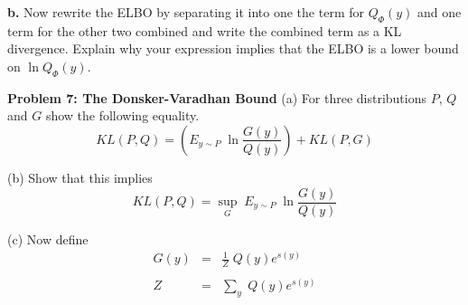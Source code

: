 \documentclass{article}
\newcommand{\solution}[1]{}
\begin{document}
\bigskip
{\bf b.}  Now rewrite the ELBO by separating it into one the term for $Q_\Phi(y)$ and one term for the other two combined and write the combined term
as a KL divergence.  Explain why your expression implies that the ELBO is a lower bound on $\ln Q_\Phi(y)$.

\solution{
  \begin{eqnarray*}
    ELBO & = & E_{z \sim \tilde{Q}_\Psi(z|y)}\;\ln \frac{Q_\Phi(y)Q_\Phi(z|y)}{\tilde{Q}_\Psi(z|y)} \\
    \\
    & = & \left(E_{z \sim \tilde{Q}_\Psi(z|y)}\;\ln Q_\Phi(y)\right) +
    \left(E_{z \sim \tilde{Q}_\Psi(z|y)}\;\ln \frac{Q_\Phi(z|y)}{\tilde{Q}_\Psi(z|y)}\right) \\
    & = & \ln Q_\Phi(y) - KL(\tilde{Q}_\Psi(z|y),Q_\Phi(z|y))
  \end{eqnarray*}

  The lower bound property follows from the fact that KL divergence is non-negative.
}

\bigskip
{\bf Problem 7: The Donsker-Varadhan Bound}
(a) For three distributions $P$, $Q$ and $G$ show the following equality.
$$KL(P,Q) =  \left(E_{y \sim P} \;\ln \frac{G(y)}{Q(y)}\right) + KL(P,G)$$

\solution{
  \begin{eqnarray*}
    KL(P,Q) & = & E_{y \sim P} \;\ln \frac{P(y)}{Q(y)} \\
    & = & E_{y \sim P} \;\ln \frac{P(y)G(y)}{Q(y)G(y)} \\
    & = & \left(E_{y \sim P} \;\ln \frac{G(y)}{Q(y)}\right) + \left(E_{y \sim P} \;\ln \frac{P(y)}{G(y)}\right) \\
    & = & \left(E_{y \sim P} \;\ln \frac{G(y)}{Q(y)}\right) + KL(P,G) \\
  \end{eqnarray*}
}

(b) Show that this implies
\begin{equation}
  KL(P,Q) =  \sup_G \;E_{y \sim P}\; \ln \frac{G(y)}{Q(y)}
\end{equation}


  \solution{
    Part (a) implies that $$KL(P,Q) \geq \;E_{y \sim P}\; \ln \frac{G(y)}{Q(y)}$$
    and also implies that for $G = P$ we have equality.
  }
  
(c) Now define
\begin{eqnarray}
  G(y) & = & \frac{1}{Z}\;Q(y)e^{s(y)} \\
  \nonumber \\
  Z & = & \sum_y \;Q(y)e^{s(y)}
\end{eqnarray}
\end{document}

